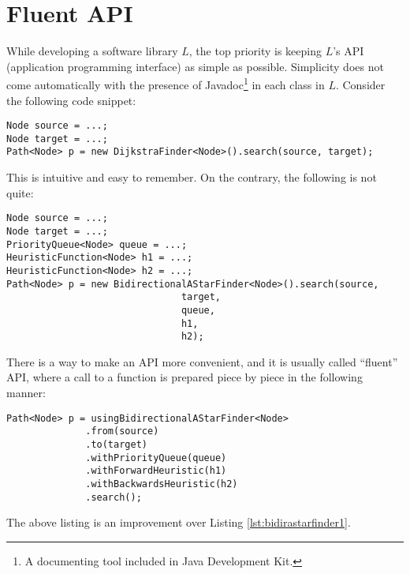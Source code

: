 \documentclass{book}
\begin{document}
\section{Fluent API}
While developing a software library $L$, the top priority is keeping $L$'s API (application programming interface) as simple as possible. Simplicity does not come automatically with the presence of Javadoc\footnote{A documenting tool included in Java Development Kit.} in each class in $L$. Consider the following code snippet:
\begin{lstlisting}
Node source = ...;
Node target = ...;
Path<Node> p = new DijkstraFinder<Node>().search(source, target);
\end{lstlisting}
\newpage
\noindent This is intuitive and easy to remember. On the contrary, the following is not quite:
\begin{lstlisting}[caption={Too much arguments for a method call},label=lst:bidirastarfinder1]
Node source = ...;
Node target = ...;
PriorityQueue<Node> queue = ...;
HeuristicFunction<Node> h1 = ...;
HeuristicFunction<Node> h2 = ...;
Path<Node> p = new BidirectionalAStarFinder<Node>().search(source, 
							   target, 
							   queue, 
							   h1, 
							   h2);
\end{lstlisting}
There is a way to make an API more convenient, and it is usually called ``fluent'' API, where a call to a function is prepared piece by piece in the following manner:
\begin{lstlisting}
Path<Node> p = usingBidirectionalAStarFinder<Node>
              .from(source)
              .to(target)
              .withPriorityQueue(queue)
              .withForwardHeuristic(h1)
              .withBackwardsHeuristic(h2)
              .search();
\end{lstlisting}
The above listing is an improvement over Listing \ref{lst:bidirastarfinder1}.
\end{document}
